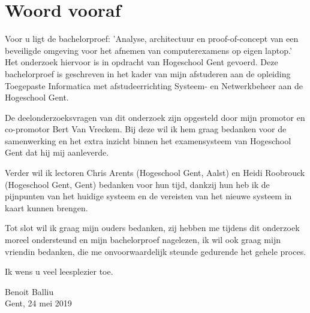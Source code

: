 
\chapter*{Woord vooraf}
\label{ch:voorwoord}


Voor u ligt de bachelorproef: 'Analyse, architectuur en proof-of-concept van een beveiligde omgeving voor het afnemen van computerexamens op eigen laptop.' Het onderzoek hiervoor is in opdracht van Hogeschool Gent gevoerd. Deze bachelorproef is geschreven in het kader van mijn afstuderen aan de opleiding Toegepaste Informatica met afstudeerrichting Systeem- en Netwerkbeheer aan de Hogeschool Gent.

De deelonderzoeksvragen van dit onderzoek zijn opgesteld door mijn promotor en co-promotor Bert Van Vreckem. Bij deze wil ik hem graag bedanken voor de samenwerking en het extra inzicht binnen het examensysteem van Hogeschool Gent dat hij mij aanleverde. 

Verder wil ik lectoren Chris Arents (Hogeschool Gent, Aalst) en Heidi Roobrouck (Hogeschool Gent, Gent) bedanken voor hun tijd, dankzij hun heb ik de pijnpunten van het huidige systeem en de vereisten van het nieuwe systeem in kaart kunnen brengen.

Tot slot wil ik graag mijn ouders bedanken, zij hebben me tijdens dit onderzoek moreel ondersteund en mijn bachelorproef nagelezen, ik wil ook graag mijn vriendin bedanken, die me onvoorwaardelijk steunde gedurende het gehele proces.

Ik wens u veel leesplezier toe.

Benoit Balliu \\
Gent, 24 mei 2019 